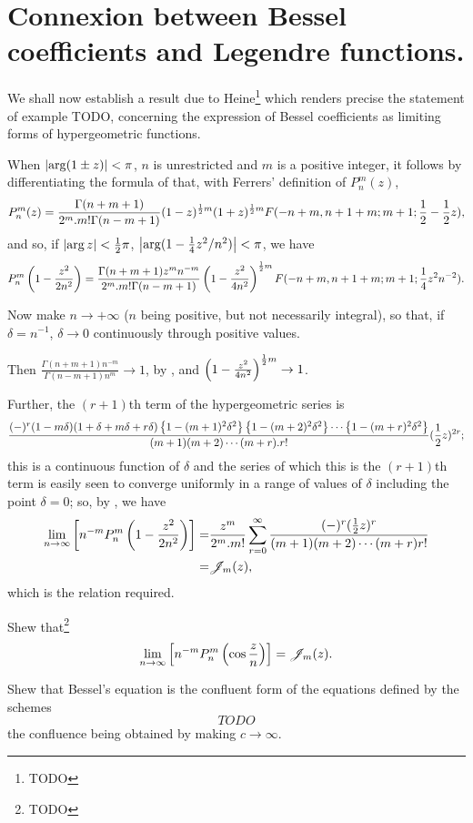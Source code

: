 \documentclass{book}
\begin{document}
\section{Connexion between Bessel coefficients and Legendre
  functions.}
We shall now establish a result due to Heine\footnote{TODO} which
renders precise the statement of  example
TODO, concerning the expression of Bessel coefficients as limiting
forms of hypergeometric functions.

When $\left| \arg(1\pm z) \right| < \pi$, $n$ is unrestricted and $m$ is a
positive integer, it follows by differentiating the formula of
 that, with Ferrers' definition of
$P_n^{m}(z)$,
$$
P_n^{m}(z)
=
\frac{\Gamma(n+m+1)}{2^m . m! \Gamma(n-m+1)}
(1-z)^{\frac{1}{2} m}
(1+z)^{\frac{1}{2} m}
F(-n+m,n+1+m; m+1; \frac{1}{2} - \frac{1}{2} z),
$$
and so, if $\left| \arg z \right| < \frac{1}{2}\pi$,
$\left| \arg (1 - \frac{1}{4} z^2/n^2) \right| < \pi$, we have
$$
P_n^{m}\left( 1 - \frac{z^2}{2n^2} \right)
=
\frac{\Gamma(n+m+1) z^m n^{-m}}{2^m . m! \Gamma(n-m+1)}
\left( 1 - \frac{z^2}{4n^2} \right)^{\frac{1}{2} m}
F(-n+m,n+1+m;m+1; \frac{1}{4} z^2 n^{-2}).
$$

Now make $n \rightarrow +\infty$ ($n$ being positive, but not
necessarily integral), so that, if $\delta = n^{-1}$, 
$\delta \rightarrow 0$ continuously through positive values.

Then
$ \frac{\Gamma(n+m+1)n^{-m}}{\Gamma(n-m+1) n^m} \rightarrow 1$,
by , and
$ \left( 1 - \frac{z^2}{4n^2} \right)^{\frac{1}{2} m} \rightarrow 1$.

Further, the $(r+1)$th term of the hypergeometric series is
$$
\frac{
  (-)^r
  (1-m\delta)
  (1+\delta+m\delta+r\delta)
  \left\{  1 - (m+1)^2 \delta^2  \right\}
  \left\{  1 - (m+2)^2 \delta^2  \right\}
  \cdots
  \left\{  1 - (m+r)^2 \delta^2  \right\}
}{ (m+1)(m+2)\cdots(m+r).r!}
(\frac{1}{2} z)^{2r};
$$
this is a continuous function of $\delta$ and the series of which this
is the $(r+1)$th term is easily seen to converge uniformly in a range
of values of $\delta$ including the point $\delta=0$; so, by
, we have
\begin{align*}
  \lim_{n \rightarrow \infty}
  \left[  n^{-m} P_n^{m}\left( 1 - \frac{z^2}{2n^2} \right) \right]
  =& \frac{z^m}{2^m.m!}
  \sum_{r=0}^{\infty} \frac{(-)^r (\frac{1}{2}
    z)^r}{(m+1)(m+2)\cdots(m+r)r!} \\
  =& \mathscr{J}_m(z),
\end{align*}
which is the relation required.
\begin{wandwexample}
  Shew that\footnote{TODO}
  $$
  \lim_{n\rightarrow\infty}
  \left[  n^{-m} P_n^{m}\left( \cos \frac{z}{n} \right) \right] = \mathscr{J}_m(z).
  $$
\end{wandwexample}
%
%
\begin{wandwexample}
  Shew that Bessel's equation is the confluent form of the equations
  defined by the schemes
  $$
  TODO
  $$
  the confluence being obtained by making $c \rightarrow \infty$.
\end{wandwexample}
\end{document}
